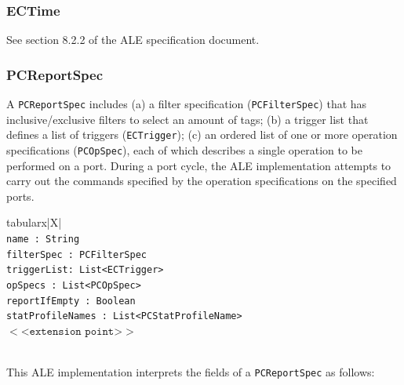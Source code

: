 \documentclass[11pt,a4paper,oneside]{article}
\newenvironment{bbox}%
{\begin{table}[h!]\begin{threeparttable}}%
{\end{threeparttable}\end{table}\FloatBarrier}
\newenvironment{bbox}
{\ifvmode\IgnorePar\fi \EndP\Tg<div class='bbox'>}{\Tg</div>\IgnoreIndent}
\begin{document}
\subsubsection{ECTime}
See section 8.2.2 of the ALE specification document.

\subsubsection{PCReportSpec}
\label{subsec: PCRep}
A \texttt{PCReportSpec} includes (a) a filter specification (\texttt{PCFilterSpec}) that has inclusive/exclusive filters to select an amount of tags; (b) a trigger list that defines a list of triggers (\texttt{ECTrigger}); (c) an ordered list of one or more operation specifications (\texttt{PCOpSpec}), each of which describes a single operation to be performed on a port. During a port cycle, the ALE implementation attempts to carry out the commands specified by the operation specifications on the specified ports.

\begin{bbox}
\begin{edtable}{tabularx}{\linewidth}{|X|}
\hline 
{}
\\
\texttt{name : String }\\
\texttt{filterSpec : PCFilterSpec}\\
\texttt{triggerList: List<ECTrigger>}\\
\texttt{opSpecs : List<PCOpSpec>}\\
\texttt{reportIfEmpty : Boolean}\\
\texttt{statProfileNames : List<PCStatProfileName>}\\
$<$<$\texttt{extension point}$>$>$\\
\texttt{\textendash \textendash \textendash}\\
\hline
\end{edtable}
\end{bbox}

This ALE implementation interprets the fields of a \texttt{PCReportSpec} as follows:
\end{document}
